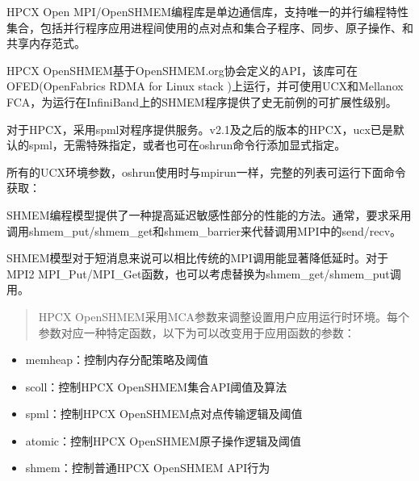 \documentclass[a4paper,12pt,english]{sphinxmanual}
\begin{document}
\sphinxAtStartPar
{}

\sphinxAtStartPar
HPC\sphinxhyphen{}X Open MPI/OpenSHMEM编程库是单边通信库，支持唯一的并行编程特性集合，包括并行程序应用进程间使用的点对点和集合子程序、同步、原子操作、和共享内存范式。

\sphinxAtStartPar
HPC\sphinxhyphen{}X OpenSHMEM基于OpenSHMEM.org协会定义的API，该库可在OFED(OpenFabrics
RDMA for Linux stack )上运行，并可使用UCX和Mellanox
FCA，为运行在InfiniBand上的SHMEM程序提供了史无前例的可扩展性级别。

\sphinxAtStartPar
{}

\sphinxAtStartPar
{}

\sphinxAtStartPar
对于HPC\sphinxhyphen{}X，采用spml对程序提供服务。v2.1及之后的版本的HPC\sphinxhyphen{}X，ucx已是默认的spml，无需特殊指定，或者也可在oshrun命令行添加显式指定。

\sphinxAtStartPar
所有的UCX环境参数，oshrun使用时与mpirun一样，完整的列表可运行下面命令获取：

\sphinxAtStartPar
{}

\sphinxAtStartPar
{}

\sphinxAtStartPar
SHMEM编程模型提供了一种提高延迟敏感性部分的性能的方法。通常，要求采用调用shmem\_put/shmem\_get和shmem\_barrier来代替调用MPI中的send/recv。

\sphinxAtStartPar
SHMEM模型对于短消息来说可以相比传统的MPI调用能显著降低延时。对于MPI\sphinxhyphen{}2
MPI\_Put/MPI\_Get函数，也可以考虑替换为shmem\_get/shmem\_put调用。

\sphinxAtStartPar
{}
\begin{quote}

\sphinxAtStartPar
HPC\sphinxhyphen{}X OpenSHMEM采用MCA参数来调整设置用户应用运行时环境。每个参数对应一种特定函数，以下为可以改变用于应用函数的参数：
\end{quote}
\begin{itemize}
\item {} 
\sphinxAtStartPar
memheap：控制内存分配策略及阈值

\item {} 
\sphinxAtStartPar
scoll：控制HPC\sphinxhyphen{}X OpenSHMEM集合API阈值及算法

\item {} 
\sphinxAtStartPar
spml：控制HPC\sphinxhyphen{}X OpenSHMEM点对点传输逻辑及阈值

\item {} 
\sphinxAtStartPar
atomic：控制HPC\sphinxhyphen{}X OpenSHMEM原子操作逻辑及阈值

\item {} 
\sphinxAtStartPar
shmem：控制普通HPC\sphinxhyphen{}X OpenSHMEM API行为

\end{itemize}
\end{document}
